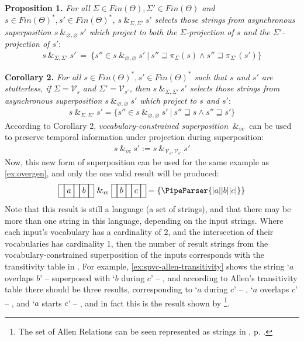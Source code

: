 \documentclass[a4paper,12pt,leqno]{article}
\newcommand{\vph}[1]{\vphantom{#1}}
\newcommand{\ebox}[1]{\fbox{$\vph{'(),}#1$}}
\newcommand{\nbBefore}[2]{\ebox{#1}\ebox{}\ebox{#2}}
\newcommand{\nbOverlaps}[2]{\ebox{#1}\ebox{#1,#2}\ebox{#2}}
\newcommand{\nbDuring}[2]{\ebox{#2}\ebox{#1,#2}\ebox{#2}}
\newcommand{\nbStarts}[2]{\ebox{#1,#2}\ebox{#2}}
\newcommand{\Before}[2]{\ebox{}\nbBefore{#1}{#2}\ebox{}}
\newcommand{\Overlaps}[2]{\ebox{}\nbOverlaps{#1}{#2}\ebox{}}
\newcommand{\During}[2]{\ebox{}\nbDuring{#1}{#2}\ebox{}}
\newcommand{\Starts}[2]{\ebox{}\nbStarts{#1}{#2}\ebox{}}
\newcommand{\cOverlaps}[2]{`$#1$ overlaps $#2$' -- \Overlaps{#1}{#2}}
\newcommand{\cDuring}[2]{`$#1$ during $#2$' -- \During{#1}{#2}}
\newcommand{\cStarts}[2]{`$#1$ starts $#2$' -- \Starts{#1}{#2}}
\newcommand{\spsigma}[1][\Sigma, \Sigma']{~\&_{#1}~}
\newcommand{\spvc}{~\&_{v\!c}~}
\newcommand{\V}{\mathcal{V}}
\renewcommand{\emptyset}{\varnothing}
\newcommand{\EventString}[1]{%
	\renewcommand*{\do}[1]{\ebox{##1}}%
	\PipeParser{#1}%
}
\begin{document}
\noindent
\textbf{Proposition 1.} {\sl For all $\Sigma \in Fin(\Theta), \Sigma' \in Fin(\Theta)$ and $s \in Fin(\Theta)^*, s' \in Fin(\Theta)^*$, $s \spsigma s'$ selects those strings from asynchronous superposition $s \spsigma[\emptyset, \emptyset] s'$ which project to both the $\Sigma$-projection of $s$ and the $\Sigma'$-projection of $s'$}:
\begin{align}
s \spsigma s' ~=~ \{s'' \in s \spsigma[\emptyset, \emptyset] s' ~|~
s'' \sqsupseteq \pi_{\Sigma}(s) \wedge s'' \sqsupseteq \pi_{\Sigma'}(s')\}
\end{align}

\noindent
\textbf{Corollary 2.} {\sl For all $s \in Fin(\Theta)^*, s' \in Fin(\Theta)^*$ such that $s$ and $s'$ are stutterless, if $\Sigma = \V_s$ and $\Sigma' =\V_{s'}$, then $s \spsigma s'$ selects those strings from asynchronous superposition $s \spsigma[\emptyset, \emptyset] s'$ which project to $s$ and $s'$}:
\begin{align}
s \spsigma s' = \{s''\in s \spsigma[\emptyset, \emptyset] s' ~|~ s'' \sqsupseteq s \wedge s'' \sqsupseteq s'\}
\end{align}
\doublespacing
According to Corollary 2, \textit{vocabulary-constrained superposition} $\spvc$ can be used to preserve temporal information under projection during superposition:
\begin{align}\label{def:vc-superposition}
s \spvc s' :=  s \spsigma[\V_s, \V_{s'}] s'
\end{align}
Now, this new form of superposition can be used for the same example as \cref{ex:overgen}, and only the one valid result will be produced:
\begin{align}
	\Before{a}{b} \spvc \Before{b}{c} = \{\EventString{{}|a|{}|b|{}|c|{}}\}
\end{align}
Note that this result is still a language (a set of strings), and that there may be more than one string in this language, depending on the input strings. Where each input's vocabulary has a cardinality of 2, and the intersection of their vocabularies has cardinality 1, then the number of result strings from the vocabulary-constrained superposition of the inputs corresponds with the transitivity table in \citet[Fig. 4]{allen1983maintaining}. For example, \cref{ex:spvc-allen-transitivity} shows the string \cOverlaps{a}{b} superposed with \cDuring{b}{c}, and according to Allen's transitivity table there should be three results, corresponding to \cDuring{a}{c}, \cOverlaps{a}{c}, and \cStarts{a}{c}, and in fact this is the result shown by \footnote{The set of Allen Relations can be seen represented as strings in , p. \pageref{tab:allen-rels-strings}.}.
\end{document}
